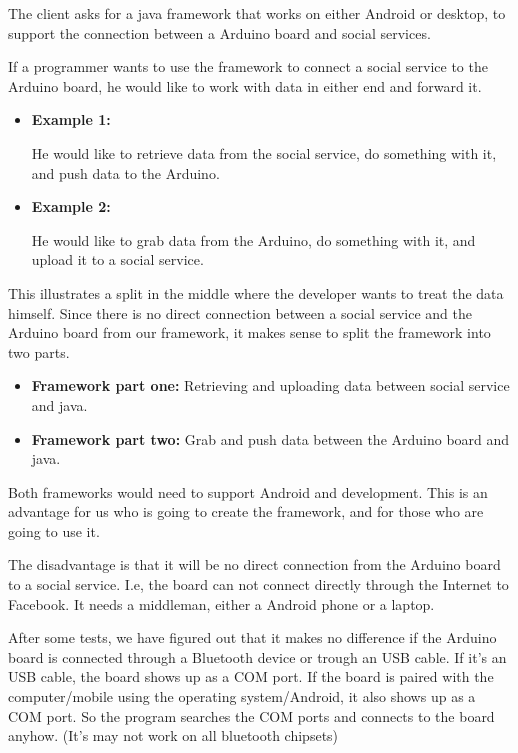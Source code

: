 The client asks for a java framework that works on either Android or desktop, to support the connection between a Arduino board and social services.

If a programmer wants to use the framework to connect a social service to the Arduino board, he would like to work with data in either end and forward it.

\begin{itemize}
  \item\textbf{Example 1:} 

  He would like to retrieve data from the social service, do something with it, and push data to the Arduino.

  \item\textbf{Example 2:}

  He would like to grab data from the Arduino, do something with it, and upload it to a social service.
\end{itemize}

This illustrates a split in the middle where the developer wants to treat the data himself. Since there is no direct connection between a social service and the Arduino board from our framework, it makes sense to split the framework into two parts.

\begin{itemize}
  \item\textbf{Framework part one:} Retrieving and uploading data between social service and java.
  \item\textbf{Framework part two:} Grab and push data between the Arduino board and java.
\end{itemize}

Both frameworks would need to support Android and development. This is an advantage for us who is going to create the framework, and for those who are going to use it.

The disadvantage is that it will be no direct connection from the Arduino board to a social service.
I.e, the board can not connect directly through the Internet to Facebook. It needs a middleman, either a Android phone or a laptop.

After some tests, we have figured out that it makes no difference if the Arduino board is connected through a Bluetooth device or trough an USB cable. If it's an USB cable, the board shows up as a COM port. If the board is paired with the computer/mobile using the operating system/Android, it also shows up as a COM port. So the program searches the COM ports and connects to the board anyhow. (It's may not work on all bluetooth chipsets)


